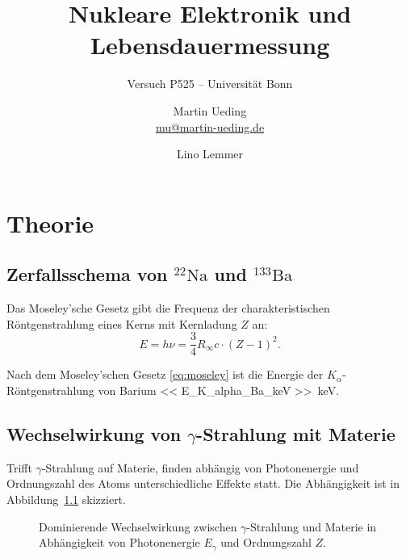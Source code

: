 


\usepackage{tikz}
\usetikzlibrary{chains}
\usetikzlibrary{shapes.geometric}

\usepackage{pgfplots}

\tikzexternalize

\usepackage{booktabs}

\hypersetup{
    pdftitle=
}

\subject{Praktikumsprotokoll}
\title{Nukleare Elektronik und Lebensdauermessung}
\subtitle{Versuch P525 -- Universität Bonn}
\author{
    Martin Ueding \\ \small{\href{mailto:mu@martin-ueding.de}{mu@martin-ueding.de}}
    \and
    Lino Lemmer
}
\publishers{Tutor: Damian-Maria Piontek}



\maketitle

\tableofcontents

\chapter{Theorie}

\section{Zerfallsschema von ${}^{22}\text{Na}$ und ${}^{133}\text{Ba}$}

Das Moseley'sche Gesetz gibt die Frequenz der charakteristischen Röntgenstrahlung eines Kerns mit Kernladung $Z$ an: \parencite[(17.10)]{meschede-gerthsen_24}
\begin{equation}
    \label{eq:moseley}
    E = h \nu = \frac 34 R_\infty c \cdot (Z - 1)^2.
\end{equation}

Nach dem Moseley'schen Gesetz \eqref{eq:moseley} ist die Energie der $K_\alpha$-Röntgenstrahlung
von Barium \SI{<< E_K_alpha_Ba_keV >>}{\kilo\electronvolt}.

\section{Wechselwirkung von $\gamma$-Strahlung mit Materie}

Trifft $\gamma$-Strahlung auf Materie, finden abhängig von Photonenergie und
Ordnungszahl des Atoms unterschiedliche Effekte statt. Die Abhängigkeit ist in
Abbildung~\ref{fig:wechselwirkung} skizziert.
\begin{figure}
    \centering
    \caption{%
        Dominierende Wechselwirkung zwischen $\gamma$-Strahlung und Materie in
        Abhängigkeit von Photonenergie $E_\gamma$ und Ordnungszahl
        $Z$.%
    }
    \label{fig:wechselwirkung}
\end{figure}

